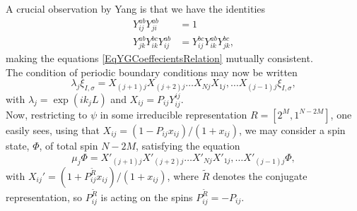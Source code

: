 A crucial observation by Yang is that we have the identities \begin{equation}
\begin{aligned}
Y_{ij}^{ab}Y_{ji}^{ab}&=1\\
Y_{jk}^{ab}Y_{ik}^{bc}Y_{ij}^{ab}&=Y_{ij}^{bc}Y_{ik}^{ab}Y_{jk}^{bc},
\end{aligned}
\end{equation}
making the equations \eqref{EqYGCoeffecientsRelation} mutually consistent.\\
The condition of periodic boundary conditions may now be written \begin{equation}\label{EqYGPeriodicBoundaryCondition}
\lambda_j\xi_{I,\sigma}=X_{(j+1)j}X_{(j+2)j}\ldots X_{Nj}X_{1j},\ldots X_{(j-1)j}\xi_{I,\sigma},
\end{equation}
with $ \lambda_j=\exp(ik_j L) $ and $ X_{ij}=P_{ij}Y_{ij}^{ij} $.\\
Now, restricting to $ \psi $ in some irreducible representation $ R=[2^{M},1^{N-2M}] $, one easily sees, using that $ X_{ij}=(1-P_{ij}x_{ij})/(1+x_{ij}) $,  we may consider a spin state, $ \Phi $, of total spin $ N-2M $, satisfying the equation \begin{equation}
\mu_j\Phi=X'_{(j+1)j}X'_{(j+2)j}\ldots X'_{Nj}X'_{1j},\ldots X'_{(j-1)j} \Phi,
\end{equation}
with $ X_{ij}'=(1+P^{\tilde{R}}_{ij}x_{ij})/(1+x_{ij}) $, where $ \tilde{R} $ denotes the conjugate representation, so $ P^{\tilde{R}}_{ij} $ is acting on the spins \ie $ P^{\tilde{R}}_{ij}=-P_{ij} $.\\
